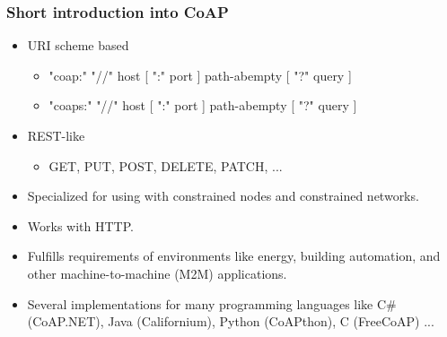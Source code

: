\documentclass[11pt,t,usepdftitle=false,aspectratio=169,usenames,dvipsnames]{beamer}
\begin{document}
    \begin{frame}
        \frametitle{Short introduction into CoAP}

        \begin{itemize}
            \item URI scheme based
            \begin{itemize}
                \item "coap:" "//" host [ ":" port ] path-abempty [ "?" query ]
                \item "coaps:" "//" host [ ":" port ] path-abempty [ "?" query ]
            \end{itemize}
            \item REST-like
            \begin{itemize}
                \item GET, PUT, POST, DELETE, PATCH, ...
            \end{itemize}
            \item Specialized for using with constrained nodes and constrained networks.
            \item Works with HTTP.
            \item Fulfills requirements of environments like energy, building automation, and other machine-to-machine (M2M) applications.
            \item Several implementations for many programming languages like C\# (CoAP.NET), Java (Californium), Python (CoAPthon), C (FreeCoAP) ...
        \end{itemize}
    \end{frame}
\end{document}
